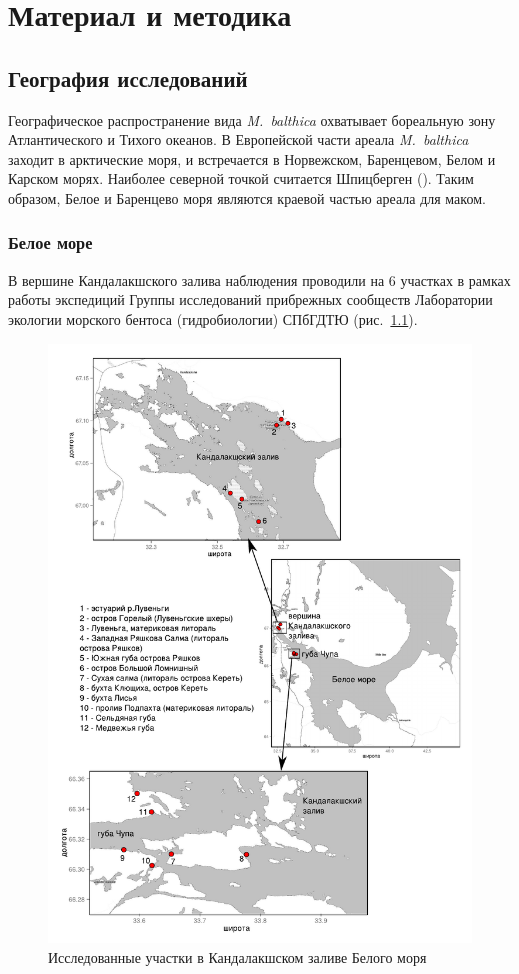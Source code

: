 \chapter{Материал и методика}
	\section{География исследований}
Географическое распространение вида {\it M.~balthica} охватывает бореальную зону Атлантического и Тихого океанов.
В Европейской части ареала {\it M.~balthica} заходит в арктические моря, и встречается в Норвежском, Баренцевом, Белом и Карском морях.
Наиболее северной точкой считается Шпицберген (\cite{Zacepin_Filatova_1968}).
Таким образом, Белое и Баренцево моря являются краевой частью ареала для маком.
		\subsection{Белое море}
В вершине Кандалакшского залива наблюдения проводили на $6$ участках в рамках работы экспедиций Группы исследований прибрежных сообществ Лаборатории экологии морского бентоса (гидробиологии) СПбГДТЮ (рис.~\ref{ris:karta_White}). 
	\begin{figure}[p]
    \includegraphics[width=\textwidth]{../maps/White_sea1.pdf}
    \caption{Исследованные участки в Кандалакшском заливе Белого моря}
    \label{ris:karta_White}
	\end{figure}

